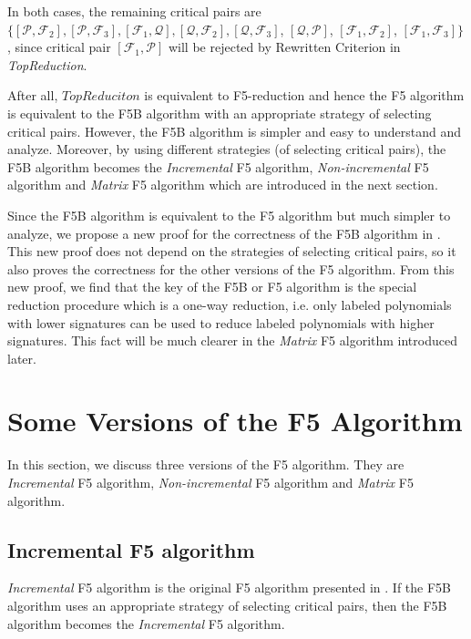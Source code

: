 \documentclass[preprint,authoryear,3p,12pt]{elsarticle}
\begin{document}
In both cases, the remaining  critical pairs are $\{[{\mathcal
P}, {\mathcal F}_2], [{\mathcal P}, {\mathcal F}_3], [{\mathcal
F}_1, {\mathcal Q}], [{\mathcal Q}, {\mathcal F}_2], [{\mathcal
Q}, {\mathcal F}_3]$, $[{\mathcal Q}, {\mathcal P}]$, $[{\mathcal
F}_1, {\mathcal F}_2]$, $[{\mathcal F}_1, {\mathcal F}_3]\}$,
since critical pair $[{\mathcal F}_1, {\mathcal P}]$ will be
rejected by Rewritten Criterion in {\em TopReduction}.

After all, $TopReduciton$ is equivalent to F5-reduction and hence
the F5 algorithm is equivalent to the F5B algorithm with an
appropriate strategy of selecting critical pairs. However, the F5B
algorithm is simpler and easy to understand and analyze. Moreover,
by using different strategies (of selecting critical pairs), the F5B
algorithm becomes the {\em Incremental} F5 algorithm, {\em
Non-incremental} F5 algorithm and {\em Matrix} F5 algorithm which
are introduced in the next section.

Since the F5B algorithm is equivalent to the F5 algorithm but much
simpler to analyze, we propose a new proof for the correctness of
the F5B algorithm in \citep{SunWang10}. This new proof does not
depend on the strategies of selecting critical pairs, so it also
proves the correctness for the other versions of the F5 algorithm.
From this new proof, we find that the key of the F5B or F5 algorithm
is the special reduction procedure which is a one-way reduction,
i.e. only labeled polynomials with lower signatures can be used to
reduce labeled polynomials with higher signatures. This fact will be
much clearer in the {\it Matrix} F5 algorithm introduced later.




\section{Some Versions of the F5 Algorithm} \label{sec-presentversion}


In this section, we discuss three versions of the F5 algorithm. They
are {\em Incremental} F5 algorithm, {\em Non-incremental} F5
algorithm and {\em Matrix} F5 algorithm.



\subsection{Incremental F5 algorithm}

{\em Incremental} F5 algorithm is the original F5 algorithm
presented in \citep{Fau02}. If the F5B algorithm uses an appropriate
strategy of selecting critical pairs, then the F5B algorithm becomes
the {\em Incremental} F5 algorithm.
\end{document}
